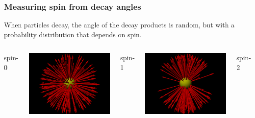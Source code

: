\documentclass[compress]{beamer}
\begin{document}
\begin{frame}
\frametitle{Measuring spin from decay angles}

When particles decay, the angle of the decay products is random, but with a probability distribution that depends on spin.

\vfill
\begin{columns}
\centering spin-0

\includegraphics[width=\linewidth]{spin0.png}

\centering spin-1

\includegraphics[width=\linewidth]{spin1.png}

\centering spin-2


\end{columns}
\end{frame}
\end{document}
